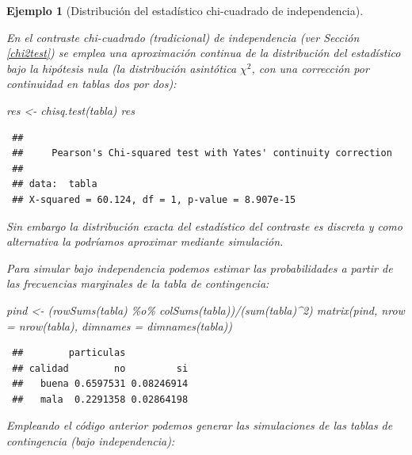 \documentclass[
]{book}
\newenvironment{Shaded}{\begin{snugshade}}{\end{snugshade}}
\newcommand{\AttributeTok}[1]{\textcolor[rgb]{0.77,0.63,0.00}{#1}}
\newcommand{\DecValTok}[1]{\textcolor[rgb]{0.00,0.00,0.81}{#1}}
\newcommand{\FunctionTok}[1]{\textcolor[rgb]{0.00,0.00,0.00}{#1}}
\newcommand{\NormalTok}[1]{#1}
\newcommand{\OtherTok}[1]{\textcolor[rgb]{0.56,0.35,0.01}{#1}}
\newcommand{\SpecialCharTok}[1]{\textcolor[rgb]{0.00,0.00,0.00}{#1}}
\theoremstyle{break}
\newtheorem{example}{Ejemplo}[chapter]
\theoremstyle{nonumberplain}
\begin{document}
\begin{example}[Distribución del estadístico chi-cuadrado de independencia]
\protect\hypertarget{exm:chicuadind}{}\label{exm:chicuadind}

En el contraste chi-cuadrado (tradicional) de independencia (ver Sección \ref{chi2test}) se emplea una aproximación continua de la distribución del estadístico bajo la hipótesis nula (la distribución asintótica \(\chi^2\), con una corrección por continuidad en tablas dos por dos):

\begin{Shaded}
\begin{Highlighting}[]
\NormalTok{res }\OtherTok{\textless{}{-}} \FunctionTok{chisq.test}\NormalTok{(tabla)}
\NormalTok{res}
\end{Highlighting}
\end{Shaded}

\begin{verbatim}
 ## 
 ##     Pearson's Chi-squared test with Yates' continuity correction
 ## 
 ## data:  tabla
 ## X-squared = 60.124, df = 1, p-value = 8.907e-15
\end{verbatim}

Sin embargo la distribución exacta del estadístico del contraste es discreta y como alternativa la podríamos aproximar mediante simulación.

Para simular bajo independencia podemos estimar las probabilidades a partir de las frecuencias marginales de la tabla de contingencia:

\begin{Shaded}
\begin{Highlighting}[]
\NormalTok{pind }\OtherTok{\textless{}{-}}\NormalTok{ (}\FunctionTok{rowSums}\NormalTok{(tabla) }\SpecialCharTok{\%o\%} \FunctionTok{colSums}\NormalTok{(tabla))}\SpecialCharTok{/}\NormalTok{(}\FunctionTok{sum}\NormalTok{(tabla)}\SpecialCharTok{\^{}}\DecValTok{2}\NormalTok{)}
\FunctionTok{matrix}\NormalTok{(pind, }\AttributeTok{nrow =} \FunctionTok{nrow}\NormalTok{(tabla), }\AttributeTok{dimnames =} \FunctionTok{dimnames}\NormalTok{(tabla))}
\end{Highlighting}
\end{Shaded}

\begin{verbatim}
 ##        particulas
 ## calidad        no         si
 ##   buena 0.6597531 0.08246914
 ##   mala  0.2291358 0.02864198
\end{verbatim}

Empleando el código anterior podemos generar las simulaciones de las tablas de contingencia (bajo independencia):


\end{example}
\end{document}
